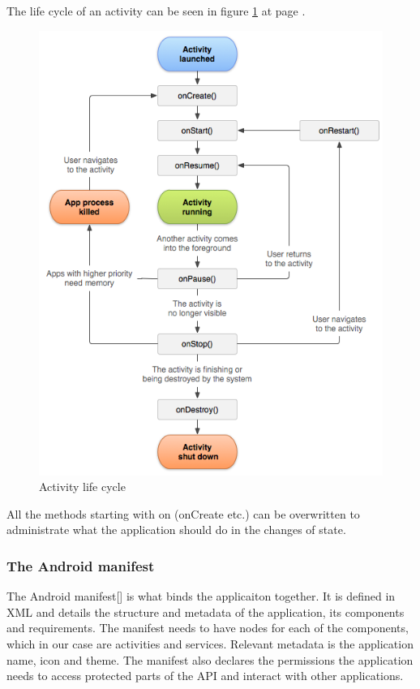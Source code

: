 The life cycle of an activity can be seen in figure \ref{fig:lifecycle} at page \pageref{fig:lifecycle}.
\begin{figure}
	\includegraphics[width=\textwidth]{activity_lifecycle}
	\caption{Activity life cycle}
	\label{fig:lifecycle}
\end{figure}

All the methods starting with on (onCreate etc.) can be overwritten to administrate what the application should do in the changes of state.

\subsubsection{The Android manifest}
The Android manifest[] is what binds the applicaiton together. It is defined in XML and details the structure and metadata of the application, its components and requirements. The manifest needs to have nodes for each of the components, which in our case are activities and services. Relevant metadata is the application name, icon and theme. The manifest also declares the permissions the application needs to access protected parts of the API and interact with other applications.

